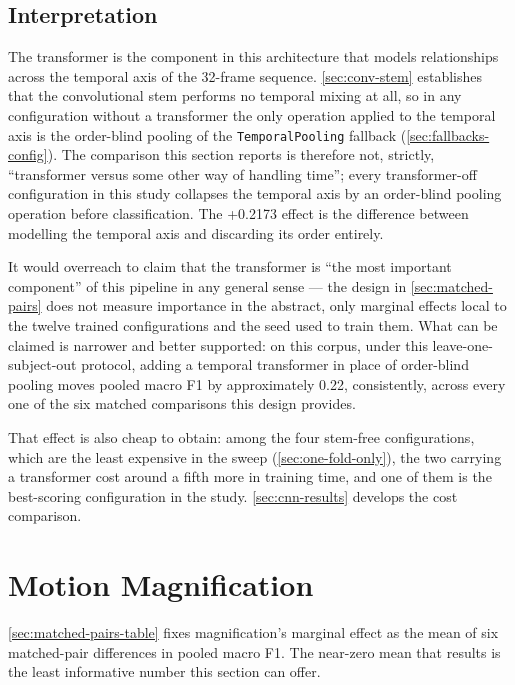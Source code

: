 \subsection{Interpretation}
\label{sec:transformer-interpretation}

The transformer is the component in this architecture that models relationships across the temporal axis of the 32-frame sequence. \autoref{sec:conv-stem} establishes that the convolutional stem performs no temporal mixing at all, so in any configuration without a transformer the only operation applied to the temporal axis is the order-blind pooling of the \texttt{TemporalPooling} fallback (\autoref{sec:fallbacks-config}). The comparison this section reports is therefore not, strictly, ``transformer versus some other way of handling time''; every transformer-off configuration in this study collapses the temporal axis by an order-blind pooling operation before classification. The +0.2173 effect is the difference between modelling the temporal axis and discarding its order entirely.

It would overreach to claim that the transformer is ``the most important component'' of this pipeline in any general sense --- the design in \autoref{sec:matched-pairs} does not measure importance in the abstract, only marginal effects local to the twelve trained configurations and the seed used to train them. What can be claimed is narrower and better supported: on this corpus, under this leave-one-subject-out protocol, adding a temporal transformer in place of order-blind pooling moves pooled macro F1 by approximately 0.22, consistently, across every one of the six matched comparisons this design provides.

That effect is also cheap to obtain: among the four stem-free configurations, which are the least expensive in the sweep (\autoref{sec:one-fold-only}), the two carrying a transformer cost around a fifth more in training time, and one of them is the best-scoring configuration in the study. \autoref{sec:cnn-results} develops the cost comparison.


\section{Motion Magnification}
\label{sec:evm-results}

\autoref{sec:matched-pairs-table} fixes magnification's marginal effect as the mean of six matched-pair differences in pooled macro F1. The near-zero mean that results is the least informative number this section can offer.

